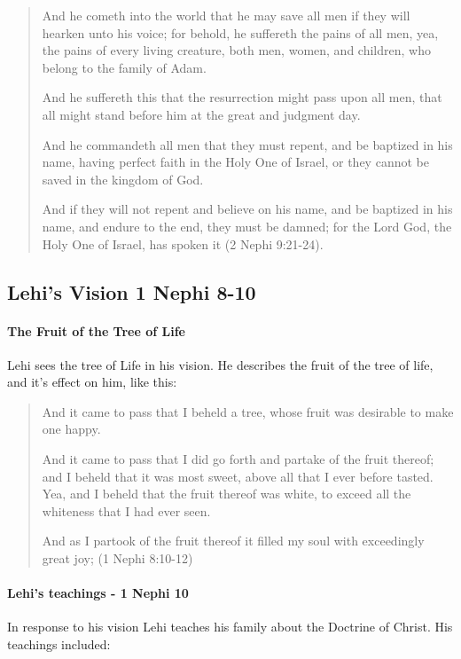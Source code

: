 \begin{quotation}
And he cometh into the world that he may save all men if they will hearken unto his voice; for behold, he suffereth the pains of all men, yea, the pains of every living creature, both men, women, and children, who belong to the family of Adam. 

And he suffereth this that the resurrection might pass upon all men, that all might stand before him at the great and judgment day. 

And he commandeth all men that they must repent, and be baptized in his name, having perfect faith in the Holy One of Israel, or they cannot be saved in the kingdom of God.

And if they will not repent and believe on his name, and be baptized in his name, and endure to the end, they must be damned; for the Lord God, the Holy One of Israel, has spoken it (2 Nephi 9:21-24).
\end{quotation}

\subsection{Lehi's Vision 1 Nephi 8-10}

\paragraph{The Fruit of the Tree of Life}
Lehi sees the tree of Life in his vision. He describes the fruit of the tree of life, and it's effect on him, like this:

\begin{quotation}
And it came to pass that I beheld a tree, whose fruit was desirable to make one happy.

And it came to pass that I did go forth and partake of the fruit thereof; and I beheld that it was most sweet, above all that I ever before tasted. Yea, and I beheld that the fruit thereof was white, to exceed all the whiteness that I had ever seen.

And as I partook of the fruit thereof it filled my soul with exceedingly great joy; (1 Nephi 8:10-12)
\end{quotation}

\paragraph{Lehi's teachings - 1 Nephi 10}
In response to his vision Lehi teaches his family about the Doctrine of Christ. His teachings included:

